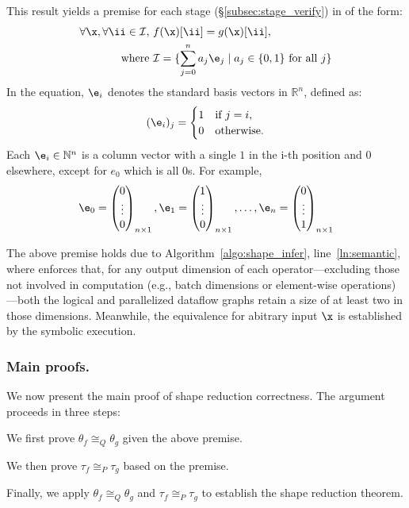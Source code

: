 This result yields a premise for each stage (\S\ref{subsec:stage_verify}) in \sys of the form:
\begin{align*}
    \forall \x,\forall \ii \in \mathcal{I},\ &f(\x)[\ii] = g(\x)[\ii], \\
    \text{ where } &\mathcal{I} = \{\sum_{j=0}^n a_j \e_j \mid a_j \in \{0,1\} \text{ for all } j\} \\
\end{align*}
In the equation,
$\e_i$ denotes the standard basis vectors in $\mathbb{R}^n$, defined as:
\[
(\e_i)_j =
\begin{cases}
1 & \text{if } j = i, \\
0 & \text{otherwise}.
\end{cases}
\]
Each $\e_i \in \mathbb{N}^n$ is a column vector with a single $1$ in the i-th position and $0$ elsewhere, except for $e_0$ which is all $0$s.
For example,
\[
    \e_0 = \begin{pmatrix}
      0  \\
      \vdots \\
      0
    \end{pmatrix}_{n\times 1},
    \e_1 = \begin{pmatrix}
      1  \\
      \vdots \\
      0
    \end{pmatrix}_{n\times 1}, \dots,
    \e_n = \begin{pmatrix}
      0  \\
      \vdots \\
      1
    \end{pmatrix}_{n\times 1}
\]

The above premise holds due to Algorithm~\ref{algo:shape_infer}, line~\ref{ln:semantic},
where \sys enforces that,
for any output dimension of each operator---excluding those not involved in
computation (e.g., batch dimensions or element-wise operations)---both the
logical and parallelized dataflow graphs retain a size of at least two in those
dimensions. %
Meanwhile, the equivalence for abitrary input $\x$ is established by the symbolic execution.



\subsubsection{Main proofs.}
We now present the main proof of shape reduction correctness.
The argument proceeds in three steps:
\begin{myenumerate2}
    \item We first prove $\theta_f \cong_Q \theta_g$ given the above premise.
    \item We then prove $\tau_f \cong_P \tau_g$ based on the premise.
    \item Finally, we apply $\theta_f \cong_Q \theta_g$ and $\tau_f \cong_P \tau_g$ to establish the shape reduction theorem.
\end{myenumerate2}

